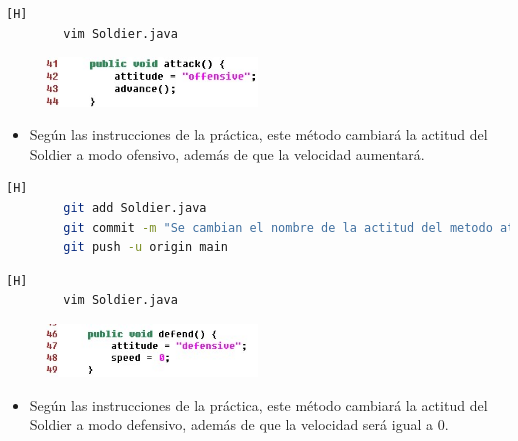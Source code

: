 \documentclass{article}
\begin{document}
	
	\begin{lstlisting}[language=bash,caption={Se crea el metodo atacar}][H]
		vim Soldier.java
	\end{lstlisting}
	
	\begin{figure}[H]
		\centering
		\includegraphics[width=0.5\textwidth,keepaspectratio]{img/attack.jpg}
	\end{figure}
	
	\begin{itemize}	
		\item Según las instrucciones de la práctica, este método cambiará la actitud del Soldier a modo ofensivo, además de que la velocidad aumentará.
	\end{itemize}
	
	\begin{lstlisting}[language=bash,caption={Commit: cf63faddd8443e7dcdd2cb62635b177373842e61d }][H]
		git add Soldier.java
		git commit -m "Se cambian el nombre de la actitud del metodo attack"			
		git push -u origin main
	\end{lstlisting}
	
	
	
	\begin{lstlisting}[language=bash,caption={Se crea el metodo defender}][H]
		vim Soldier.java
	\end{lstlisting}
	
	\begin{figure}[H]
		\centering
		\includegraphics[width=0.5\textwidth,keepaspectratio]{img/defend.jpg}
	\end{figure}
	
	\begin{itemize}	
		\item Según las instrucciones de la práctica, este método cambiará la actitud del Soldier a modo defensivo, además de que la velocidad será igual a 0.
	\end{itemize}
	
\end{document}
